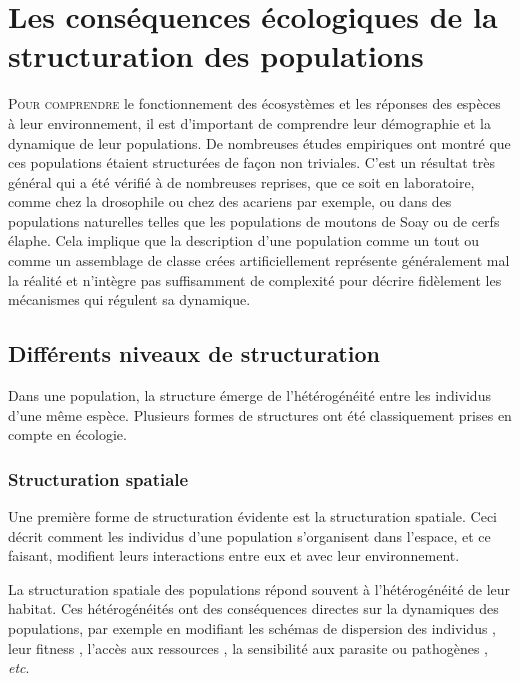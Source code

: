 \section{Les conséquences écologiques de la
structuration des populations}

\lettrine[lines=3]{P}{our comprendre} le fonctionnement des écosystèmes et les
réponses des espèces à leur environnement, il est d'important de comprendre leur démographie et la
dynamique de leur populations. De nombreuses études empiriques ont montré que
ces populations étaient structurées de façon non triviales. C'est un 
résultat très général qui a été vérifié à de nombreuses reprises, que ce soit en
laboratoire, comme chez la drosophile ou chez des acariens par exemple, ou dans
des populations naturelles telles que les populations de moutons de Soay
\autocite{coulson2001a} ou de cerfs élaphe. 
Cela implique que la description d'une population comme un tout ou comme
un assemblage de classe crées artificiellement représente généralement mal la
réalité et n'intègre pas suffisamment de complexité pour décrire fidèlement les
mécanismes qui régulent sa dynamique.

\subsection{Différents niveaux de structuration}

Dans une population, la structure émerge de l'hétérogénéité entre les
individus d'une même espèce. Plusieurs formes de structures ont été
classiquement prises en compte en écologie.

\subsubsection{Structuration spatiale}

Une première forme de structuration évidente est la structuration spatiale. Ceci
décrit comment les individus d'une population s'organisent dans l'espace, et ce
faisant, modifient leurs interactions entre eux et avec leur environnement. 

La structuration spatiale des populations répond souvent à l'hétérogénéité de
leur habitat. Ces hétérogénéités ont des conséquences directes sur la dynamiques
des populations, par exemple en modifiant les schémas de dispersion des
individus \autocite{hiebeler2000a}, leur fitness \autocite{zajkac2008a},
l'accès aux ressources \autocite{burger2008a}, la sensibilité aux parasite ou
pathogènes \autocite{su2009a}, \textit{etc}.

